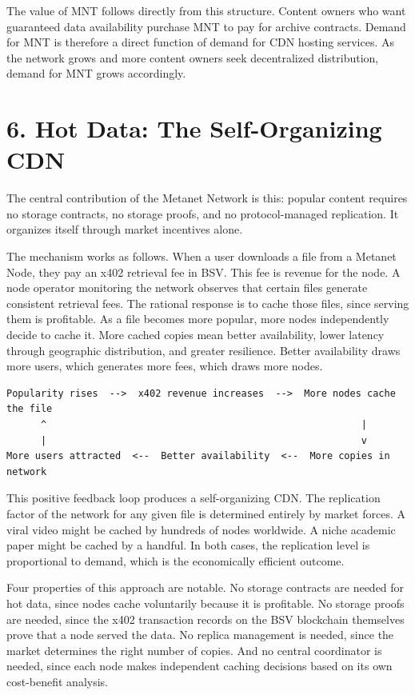 \documentclass[11pt,a4paper]{article}
\begin{document}
The value of MNT follows directly from this structure. Content owners who want guaranteed data availability purchase MNT to pay for archive contracts. Demand for MNT is therefore a direct function of demand for CDN hosting services. As the network grows and more content owners seek decentralized distribution, demand for MNT grows accordingly.

\section{6. Hot Data: The Self-Organizing CDN}

The central contribution of the Metanet Network is this: popular content requires no storage contracts, no storage proofs, and no protocol-managed replication. It organizes itself through market incentives alone.

The mechanism works as follows. When a user downloads a file from a Metanet Node, they pay an x402 retrieval fee in BSV. This fee is revenue for the node. A node operator monitoring the network observes that certain files generate consistent retrieval fees. The rational response is to cache those files, since serving them is profitable. As a file becomes more popular, more nodes independently decide to cache it. More cached copies mean better availability, lower latency through geographic distribution, and greater resilience. Better availability draws more users, which generates more fees, which draws more nodes.

\begin{lstlisting}
Popularity rises  -->  x402 revenue increases  -->  More nodes cache the file
      ^                                                       |
      |                                                       v
More users attracted  <--  Better availability  <--  More copies in network
\end{lstlisting}

This positive feedback loop produces a self-organizing CDN. The replication factor of the network for any given file is determined entirely by market forces. A viral video might be cached by hundreds of nodes worldwide. A niche academic paper might be cached by a handful. In both cases, the replication level is proportional to demand, which is the economically efficient outcome.

Four properties of this approach are notable. No storage contracts are needed for hot data, since nodes cache voluntarily because it is profitable. No storage proofs are needed, since the x402 transaction records on the BSV blockchain themselves prove that a node served the data. No replica management is needed, since the market determines the right number of copies. And no central coordinator is needed, since each node makes independent caching decisions based on its own cost-benefit analysis.
\end{document}
